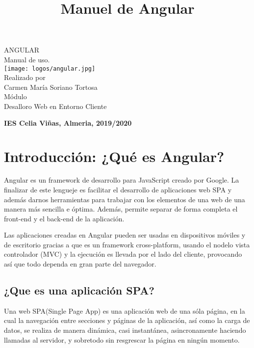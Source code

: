 \documentclass[openany]{book}
\title{Manuel de Angular}
\begin{document}
 \begin{titlepage}

 \begin{center}\bf\sffamily
  
  \vspace*{10\baselineskip}
  {\Huge ANGULAR }\\
  \doublespacing
  {\LARGE Manual de uso.}\\
  \centering
  \texttt{[image: logos/angular.jpg]}	\\
  {\large Realizado por}\\
  {\large Carmen María Soriano Tortosa}\\
  [1cm]
  {\large Módulo}\\
  {\large Desalloro Web en Entorno Cliente}  \\ 
\end{center}
\vfill
 \begin{flushright}
  {\bf\sffamily\large IES Celia Viñas, Almeria, 2019/2020 {\large }}
 \end{flushright}

\end{titlepage}

\tableofcontents %
\cleardoublepage


\chapter{Introducción: ¿Qué es Angular?}

Angular es un framework de desarrollo para JavaScript creado por Google. La finalizar de este lengueje es facilitar el desarrollo de aplicaciones web SPA y además darnos herramientas para trabajar con los elementos de una web de una manera más sencilla e óptima. Además, permite separar de forma completa el front-end y el back-end de la aplicación. 

Las aplicaciones creadas en Angular pueden ser usadas en dispositivos móviles y de escritorio gracias a que es un framework cross-platform, usando el nodelo vista controlador (MVC) y la ejecución es llevada por el lado del cliente, provocando así que todo dependa en gran parte del navegador.  

\section{¿Que es una aplicación SPA?}
Una web SPA(Single Page App) es una aplicación web de una sóla página, en la cual la navegación entre secciones y páginas de la aplicación, así como la carga de datos, se realiza de manera dinámica, casi instantánea, asincronamente haciendo llamadas al servidor, y sobretodo sin resgrescar la página en ningún momento. 
\end{document}
